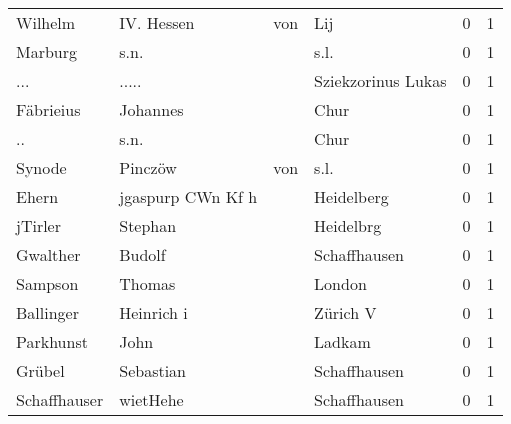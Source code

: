 \begin{tabular}{llllrr}
                  Wilhelm &                        IV.  Hessen &         von &                                         Lij &          0 &         1 \\
                  Marburg &                               s.n. &             &                                        s.l. &          0 &         1 \\
                      ... &                              ..... &             &                          Sziekzorinus Lukas &          0 &         1 \\
                Fäbrieius &                           Johannes &             &                                        Chur &          0 &         1 \\
                       .. &                               s.n. &             &                                        Chur &          0 &         1 \\
                   Synode &                            Pinczöw &         von &                                        s.l. &          0 &         1 \\
                    Ehern &                  jgaspurp CWn Kf h &             &                                  Heidelberg &          0 &         1 \\
                  jTirler &                            Stephan &             &                                   Heidelbrg &          0 &         1 \\
                 Gwalther &                             Budolf &             &                                Schaffhausen &          0 &         1 \\
                  Sampson &                             Thomas &             &                                      London &          0 &         1 \\
                Ballinger &                         Heinrich i &             &                                    Zürich V &          0 &         1 \\
                Parkhunst &                               John &             &                                      Ladkam &          0 &         1 \\
                   Grübel &                          Sebastian &             &                                Schaffhausen &          0 &         1 \\
             Schaffhauser &                           wietHehe &             &                                Schaffhausen &          0 &         1 \\

\end{tabular}

